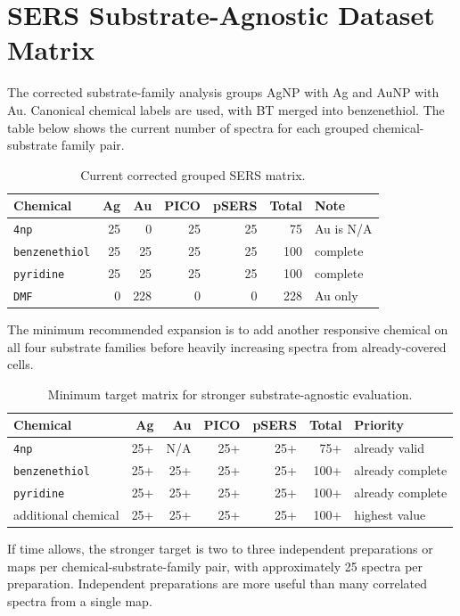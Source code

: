 \documentclass[11pt]{article}
\begin{document}
\section*{SERS Substrate-Agnostic Dataset Matrix}

The corrected substrate-family analysis groups AgNP with Ag and AuNP with Au.
Canonical chemical labels are used, with BT merged into benzenethiol. The table
below shows the current number of spectra for each grouped chemical-substrate
family pair.

\begin{table}[h]
\centering
\caption{Current corrected grouped SERS matrix.}
\begin{tabular}{lrrrrrl}
\toprule
Chemical & Ag & Au & PICO & pSERS & Total & Note \\
\midrule
\texttt{4np} & 25 & 0 & 25 & 25 & 75 & Au is N/A \\
\texttt{benzenethiol} & 25 & 25 & 25 & 25 & 100 & complete \\
\texttt{pyridine} & 25 & 25 & 25 & 25 & 100 & complete \\
\texttt{DMF} & 0 & 228 & 0 & 0 & 228 & Au only \\
\bottomrule
\end{tabular}
\end{table}

The minimum recommended expansion is to add another responsive chemical on all
four substrate families before heavily increasing spectra from already-covered
cells.

\begin{table}[h]
\centering
\caption{Minimum target matrix for stronger substrate-agnostic evaluation.}
\begin{tabular}{lrrrrrl}
\toprule
Chemical & Ag & Au & PICO & pSERS & Total & Priority \\
\midrule
\texttt{4np} & 25+ & N/A & 25+ & 25+ & 75+ & already valid \\
\texttt{benzenethiol} & 25+ & 25+ & 25+ & 25+ & 100+ & already complete \\
\texttt{pyridine} & 25+ & 25+ & 25+ & 25+ & 100+ & already complete \\
additional chemical & 25+ & 25+ & 25+ & 25+ & 100+ & highest value \\
\bottomrule
\end{tabular}
\end{table}

\noindent
If time allows, the stronger target is two to three independent preparations or
maps per chemical-substrate-family pair, with approximately 25 spectra per
preparation. Independent preparations are more useful than many correlated
spectra from a single map.
\end{document}
